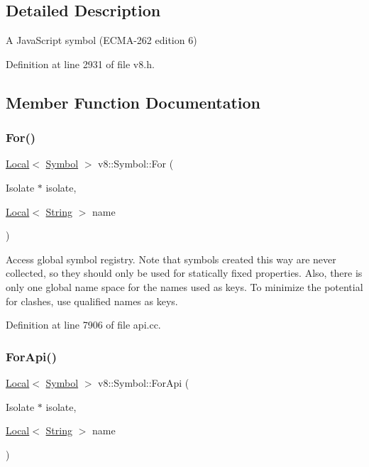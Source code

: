 \subsection{Detailed Description}
A Java\+Script symbol (E\+C\+M\+A-\/262 edition 6) 

Definition at line 2931 of file v8.\+h.



\subsection{Member Function Documentation}
\mbox{\label{classv8_1_1Symbol_a4bde7380260d3c1cab6289a8029b34c4}} 
\subsubsection{\texorpdfstring{For()}{For()}}
{\footnotesize\ttfamily \mbox{\hyperlink{classv8_1_1Local}{Local}}$<$ \mbox{\hyperlink{classv8_1_1Symbol}{Symbol}} $>$ v8\+::\+Symbol\+::\+For (\begin{DoxyParamCaption}\item[{Isolate $\ast$}]{isolate,  }\item[{\mbox{\hyperlink{classv8_1_1Local}{Local}}$<$ \mbox{\hyperlink{classv8_1_1String}{String}} $>$}]{name }\end{DoxyParamCaption})\hspace{0.3cm}{\ttfamily [static]}}

Access global symbol registry. Note that symbols created this way are never collected, so they should only be used for statically fixed properties. Also, there is only one global name space for the names used as keys. To minimize the potential for clashes, use qualified names as keys. 

Definition at line 7906 of file api.\+cc.

\mbox{\label{classv8_1_1Symbol_af1c88cf1c86bf5254bd60013e04de941}} 
\subsubsection{\texorpdfstring{For\+Api()}{ForApi()}}
{\footnotesize\ttfamily \mbox{\hyperlink{classv8_1_1Local}{Local}}$<$ \mbox{\hyperlink{classv8_1_1Symbol}{Symbol}} $>$ v8\+::\+Symbol\+::\+For\+Api (\begin{DoxyParamCaption}\item[{Isolate $\ast$}]{isolate,  }\item[{\mbox{\hyperlink{classv8_1_1Local}{Local}}$<$ \mbox{\hyperlink{classv8_1_1String}{String}} $>$}]{name }\end{DoxyParamCaption})\hspace{0.3cm}{\ttfamily [static]}}

